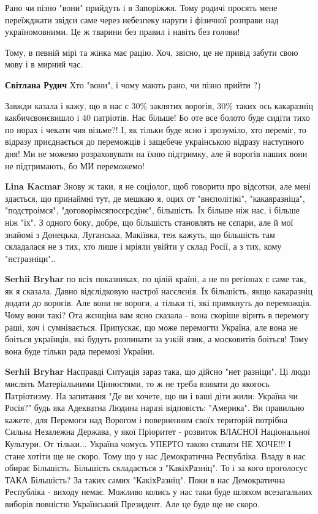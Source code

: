 \begin{itemize}
Рано чи пізно "вони" прийдуть і в Запоріжжя. Тому родичі просять мене
переїжджати звідси саме через небезпеку наруги і фізичної розправи над
україномовними. Це ж тварини без правил і навіть без голови!

Тому, в певній мірі та жінка має рацію. Хоч, звісно, це не привід забути свою
мову і в мирний час.

\begin{itemize} %
\textbf{Світлана Рудич} Хто "вони", і чому мають рано, чи пізно прийти ?)
\end{itemize} %


Завжди казала і кажу, що в нас є 30\% заклятих ворогів, 30\% таких ось какаразніц
какбичєвонєвишло і 40 патріотів. Нас більше! Бо оте все болото буде сидіти тихо
по норах і чекати чия візьме?! І, як тільки буде ясно і зрозуміло, хто переміг,
то відразу приєднається до переможців і защебече украінською відразу наступного
дня! Ми не можемо розраховувати на їхню підтримку, але й ворогів наших вони не
підтримають, бо МИ переможемо!

\begin{itemize} %
\textbf{Lina Kacmar} Знову ж таки, я не соціолог, щоб говорити про відсотки, але мені здається, що принаймні тут, де мешкаю я, оцих от "внєполітікі", "какаяразніца", "подстроімся", "договорімсяпосєрєдінє", більшість. Їх більше ніж нас, і більше ніж "їх". З одного боку, добре, що більшість становлять не сєпари, але й мої знайомі з Донецька, Луганська, Макіївка, теж кажуть, що більшість там складалася не з тих, хто лише і мріяли увійти у склад Росії, а з тих, кому "нєтразніци"..

\textbf{Serhii Bryhar} по всіх показниках, по цілій країні, а не по регіонах є саме так, як я сказала. Давно відслідковую настрої насєлєнія. Їх більшість, якщо какаразніц додати до ворогів. Але вони не вороги, а тільки ті, які примкнуть до переможців. Чому вони такі? Ота жєнщіна вам ясно сказала - вона скоріше вірить в перемогу раші, хоч і сумнівається. Припускає, що може перемогти Україна, але вона не боіться українців, які будуть розпинати за узкій язик, а московитів боіться! Тому вона буде тільки рада перемозі України.

\textbf{Serhii Bryhar} Насправді Ситуація зараз така, що дійсно "нет разніци". Ці люди мислять Матеріальними Цінностями, то ж не треба взивати до якогось Патріотизму. На запитання "Де ви хочете, що ви і ваші діти жили: Україна чи Росія?" будь яка Адекватна Людина наразі відповість: "Америка". Ви правильно кажете, для Перемоги над Ворогом і поверненням своїх територій потрібна Сильна Незалежна Держава, у якої Пріоритет - розвиток ВЛАСНОЇ Національної Культури. От тільки... Україна чомусь УПЕРТО такою ставати НЕ ХОЧЕ!!! І стане хотіти ще не скоро. Тому що у нас Демократична Республіка. Владу в нас обирає Більшість. Більшість складається з "КакіхРазніц". То і за кого проголосує ТАКА Більшість? За таких самих "КакіхРазніц". Поки в нас Демократична Республіка - виходу немає. Можливо колись у нас таки буде шляхом всезагальних виборів повністю Український Президент. Але це буде ще не скоро.


\end{itemize}
\end{itemize}
